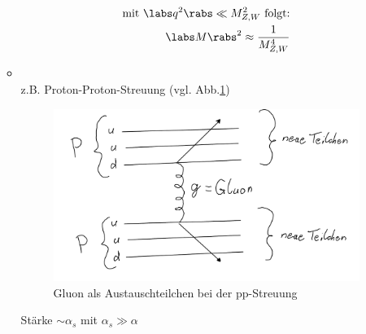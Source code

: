 \begin{itemize}
\begin{itemize}
\begin{align}
\begin{split}
\text{mit } \labs q^2\rabs \ll M_{Z,W}^2 \text{ folgt:}\\
\labs M \rabs ^2 \approx \frac{1}{M^4_{Z,W}}
\end{split}
\end{align}
\item {}\\
z.B. Proton-Proton-Streuung (vgl. Abb.\ref{fig:2.6})\\
\begin{figure}[!ht]
\centering
\includegraphics[width=.5\textwidth]{imgs/ep5-fig-2-6.pdf}
\caption{Gluon als Austauschteilchen bei der pp-Streuung\label{fig:2.6}}
\end{figure}
Stärke $\sim \alpha_s$ mit $\alpha_s \gg \alpha$
\end{itemize}
\end{itemize}
